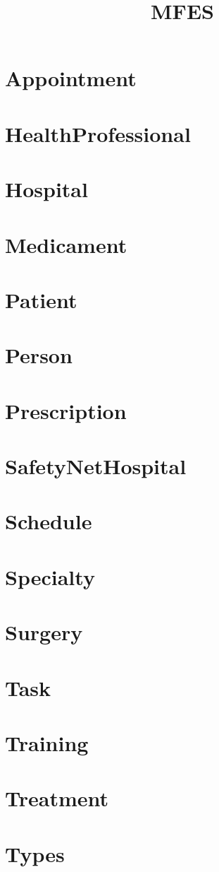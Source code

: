 \documentclass{article}
\begin{document}
\title{MFES}
\author{}
\maketitle
\tableofcontents

\section{Appointment}

\section{HealthProfessional}

\section{Hospital}

\section{Medicament}

\section{Patient}

\section{Person}

\section{Prescription}

\section{SafetyNetHospital}

\section{Schedule}

\section{Specialty}

\section{Surgery}

\section{Task}

\section{Training}

\section{Treatment}

\section{Types}

\end{document}
